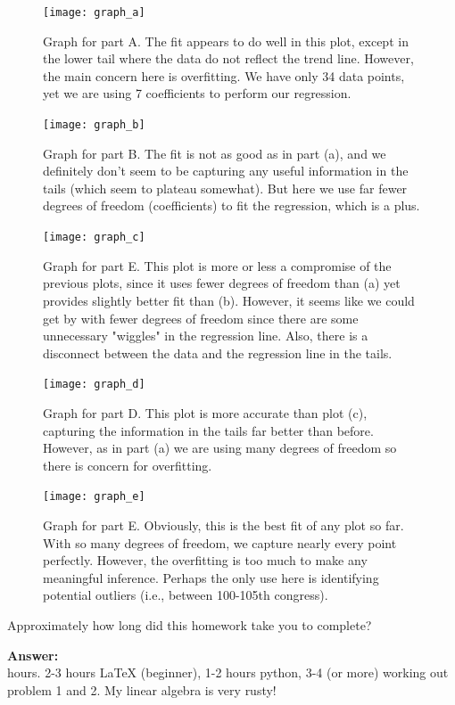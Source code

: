 \documentclass[submit]{harvardml}
\begin{document}
\begin{figure}[h]
\centering
\texttt{[image: graph\_a]}
\caption{Graph for part A. The fit appears to do well in this plot, except in the lower tail where the data do not reflect the trend line. However, the main concern here is overfitting. We have only 34 data points, yet we are using 7 coefficients to perform our regression.}
\label{fig:grapha}
\end{figure}

\begin{figure}[h]
\centering
\texttt{[image: graph\_b]}
\caption{Graph for part B. The fit is not as good as in part (a), and we definitely don't seem to be capturing any useful information in the tails (which seem to plateau somewhat). But here we use far fewer degrees of freedom (coefficients) to fit the regression, which is a plus.}
\label{fig:graphb}
\end{figure}

\begin{figure}[h]
\centering
\texttt{[image: graph\_c]}
\caption{Graph for part E. This plot is more or less a compromise of the previous plots, since it uses fewer degrees of freedom than (a) yet provides slightly better fit than (b). However, it seems like we could get by with fewer degrees of freedom since there are some unnecessary "wiggles" in the regression line. Also, there is a disconnect between the data and the regression line in the tails.}
\label{fig:graphc}
\end{figure}

\begin{figure}[h]
\centering
\texttt{[image: graph\_d]}
\caption{Graph for part D. This plot is more accurate than plot (c), capturing the information in the tails far better than before. However, as in part (a) we are using many degrees of freedom so there is concern for overfitting.}
\label{fig:graphd}
\end{figure}

\begin{figure}[h]
\centering
\texttt{[image: graph\_e]}
\caption{Graph for part E. Obviously, this is the best fit of any plot so far. With so many degrees of freedom, we capture nearly every point perfectly. However, the overfitting is too much to make any meaningful inference. Perhaps the only use here is identifying potential outliers (i.e., between 100-105th congress).}
\label{fig:graphe}
\end{figure}

\clearpage
\begin{problem}[Calibration, 1pt]
Approximately how long did this homework take you to complete?
\end{problem}
\textbf{Answer:}
\\
 hours. 2-3 hours LaTeX (beginner), 1-2 hours python, 3-4 (or more) working out problem 1 and 2. My linear algebra is very rusty!
\end{document}
